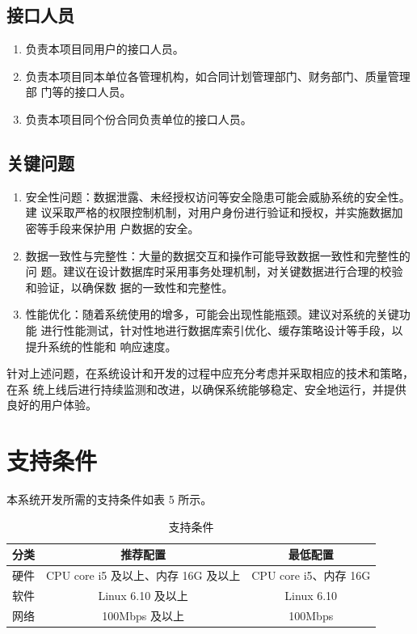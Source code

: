 \documentclass[
    report,     %
    oneside,    %
    UTF8,       %
    zihao=-4    %
]{config} %
\begin{document}
\subsection{接口人员}
\begin{enumerate}[label=(\arabic*)]
\item 负责本项目同用户的接口人员。
\item 负责本项目同本单位各管理机构，如合同计划管理部门、财务部门、质量管理部
门等的接口人员。
\item 负责本项目同个份合同负责单位的接口人员。
\end{enumerate}
\subsection{关键问题}
\begin{enumerate}[label=(\arabic*)]
\item 安全性问题：数据泄露、未经授权访问等安全隐患可能会威胁系统的安全性。建
议采取严格的权限控制机制，对用户身份进行验证和授权，并实施数据加密等手段来保护用
户数据的安全。
\item 数据一致性与完整性：大量的数据交互和操作可能导致数据一致性和完整性的问
题。建议在设计数据库时采用事务处理机制，对关键数据进行合理的校验和验证，以确保数
据的一致性和完整性。
\item 性能优化：随着系统使用的增多，可能会出现性能瓶颈。建议对系统的关键功能
进行性能测试，针对性地进行数据库索引优化、缓存策略设计等手段，以提升系统的性能和
响应速度。
\end{enumerate}
针对上述问题，在系统设计和开发的过程中应充分考虑并采取相应的技术和策略，在系
统上线后进行持续监测和改进，以确保系统能够稳定、安全地运行，并提供良好的用户体验。
\section{支持条件}
本系统开发所需的支持条件如表 5 所示。
\begin{table}[H] %
    \centering %
    \caption{支持条件} %
    \label{tab:conditions} %
    \renewcommand\arraystretch{0.85} %
    \setlength{\tabcolsep}{12pt} %
    \begin{tabular}{ccc} %
        \toprule[1.5pt] %
        \textbf{分类} & \textbf{推荐配置} & \textbf{最低配置} \\ %
        \midrule[0.8pt] %
        硬件 & CPU core i5 及以上、内存 16G 及以上 & CPU core i5、内存 16G \\ %
        软件 & Linux 6.10 及以上 & Linux 6.10 \\ %
        网络 & 100Mbps 及以上 & 100Mbps \\ %
        \hline\hline %
    \end{tabular}
\end{table}
\end{document}
